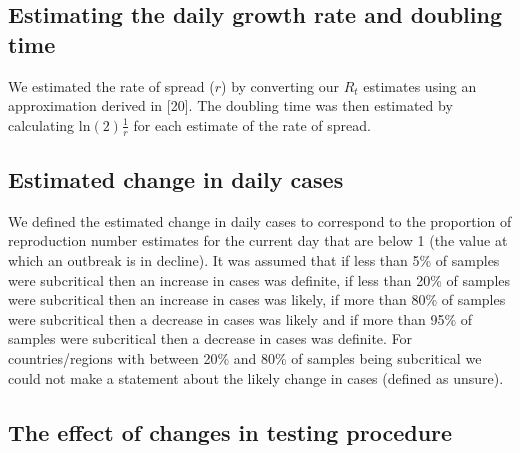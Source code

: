 \documentclass[
]{article}
\begin{document}
\hypertarget{estimating-the-daily-growth-rate-and-doubling-time}{%
\subsection{Estimating the daily growth rate and doubling
time}\label{estimating-the-daily-growth-rate-and-doubling-time}}

We estimated the rate of spread (\(r\)) by converting our \(R_t\)
estimates using an approximation derived in {[}20{]}. The doubling time
was then estimated by calculating \(\text{ln}(2) \frac{1}{r}\) for each
estimate of the rate of spread.

\hypertarget{estimated-change-in-daily-cases}{%
\subsection{Estimated change in daily
cases}\label{estimated-change-in-daily-cases}}

We defined the estimated change in daily cases to correspond to the
proportion of reproduction number estimates for the current day that are
below 1 (the value at which an outbreak is in decline). It was assumed
that if less than 5\% of samples were subcritical then an increase in
cases was definite, if less than 20\% of samples were subcritical then
an increase in cases was likely, if more than 80\% of samples were
subcritical then a decrease in cases was likely and if more than 95\% of
samples were subcritical then a decrease in cases was definite. For
countries/regions with between 20\% and 80\% of samples being
subcritical we could not make a statement about the likely change in
cases (defined as unsure).

\hypertarget{the-effect-of-changes-in-testing-procedure}{%
\subsection{The effect of changes in testing
procedure}\label{the-effect-of-changes-in-testing-procedure}}
\end{document}
